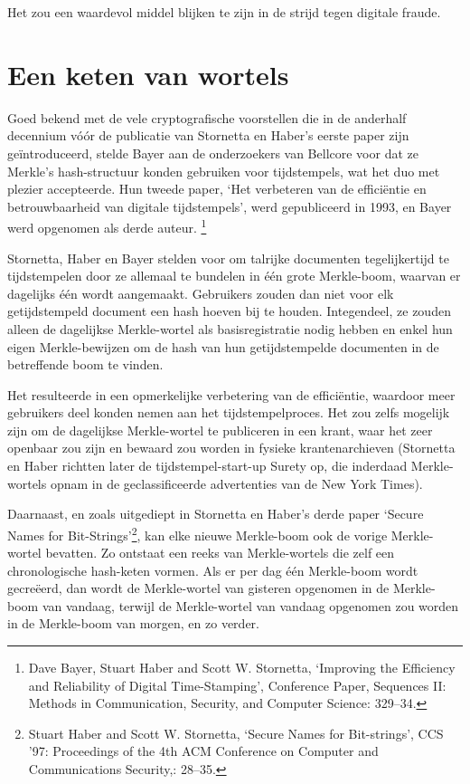 \documentclass[smalldemyvopaper,11pt,twoside,onecolumn,openright,extrafontsizes,hidelinks]{memoir}
\begin{document}
Het zou een waardevol middel blijken te zijn in de strijd tegen digitale
fraude.

\section{Een keten van wortels}\label{een-keten-van-wortels}

Goed bekend met de vele cryptografische voorstellen die in de anderhalf
decennium vóór de publicatie van Stornetta en Haber's eerste paper zijn
geïntroduceerd, stelde Bayer aan de onderzoekers van Bellcore voor dat
ze Merkle's hash-structuur konden gebruiken voor tijdstempels, wat het
duo met plezier accepteerde. Hun tweede paper, `Het verbeteren van de
efficiëntie en betrouwbaarheid van digitale tijdstempels', werd
gepubliceerd in 1993, en Bayer werd opgenomen als derde auteur.
\footnote{Dave Bayer, Stuart Haber and Scott W. Stornetta, `Improving
  the Efficiency and Reliability of Digital Time-Stamping', Conference
  Paper, Sequences II: Methods in Communication, Security, and Computer
  Science: 329--34.}

Stornetta, Haber en Bayer stelden voor om talrijke documenten
tegelijkertijd te tijdstempelen door ze allemaal te bundelen in één
grote Merkle-boom, waarvan er dagelijks één wordt aangemaakt. Gebruikers
zouden dan niet voor elk getijdstempeld document een hash hoeven bij te
houden. Integendeel, ze zouden alleen de dagelijkse Merkle-wortel als
basisregistratie nodig hebben en enkel hun eigen Merkle-bewijzen om de
hash van hun getijdstempelde documenten in de betreffende boom te
vinden.

Het resulteerde in een opmerkelijke verbetering van de efficiëntie,
waardoor meer gebruikers deel konden nemen aan het tijdstempelproces.
Het zou zelfs mogelijk zijn om de dagelijkse Merkle-wortel te publiceren
in een krant, waar het zeer openbaar zou zijn en bewaard zou worden in
fysieke krantenarchieven (Stornetta en Haber richtten later de
tijdstempel-start-up Surety op, die inderdaad Merkle-wortels opnam in de
geclassificeerde advertenties van de New York Times).

Daarnaast, en zoals uitgediept in Stornetta en Haber's derde paper
`Secure Names for Bit-Strings'\footnote{Stuart Haber and Scott W.
  Stornetta, `Secure Names for Bit-strings', CCS '97: Proceedings of the
  4th ACM Conference on Computer and Communications Security,: 28--35.},
kan elke nieuwe Merkle-boom ook de vorige Merkle-wortel bevatten. Zo
ontstaat een reeks van Merkle-wortels die zelf een chronologische
hash-keten vormen. Als er per dag één Merkle-boom wordt gecreëerd, dan
wordt de Merkle-wortel van gisteren opgenomen in de Merkle-boom van
vandaag, terwijl de Merkle-wortel van vandaag opgenomen zou worden in de
Merkle-boom van morgen, en zo verder.
\end{document}

